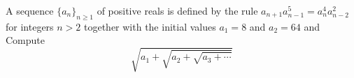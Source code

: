 A sequence $\{a_n\}_{n\geq 1}$ of positive reals is defined by the rule $a_{n+1}a_{n-1}^5=a_n^4a_{n-2}^2$ for integers $n>2$ together with the initial values $a_1=8$ and $a_2=64$ and   Compute \[\sqrt{a_1+\sqrt{a_2+\sqrt{a_3+\cdots}}}\]